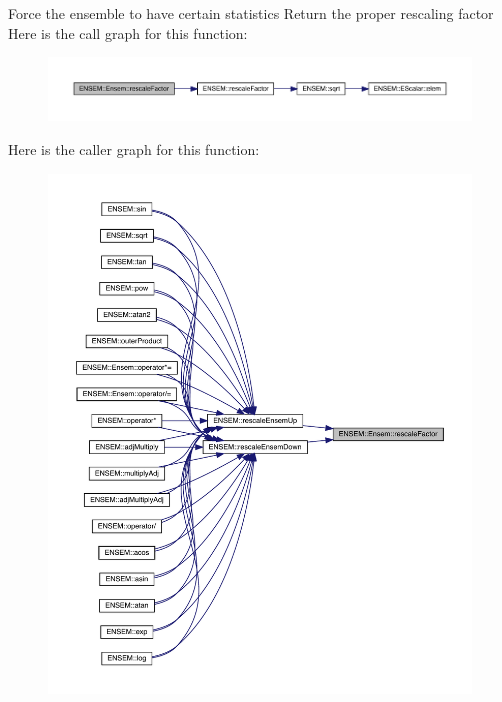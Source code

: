 Force the ensemble to have certain statistics Return the proper rescaling factor Here is the call graph for this function\+:
\nopagebreak
\begin{figure}[H]
\begin{center}
\leavevmode
\includegraphics[width=350pt]{d7/d3e/classENSEM_1_1Ensem_aecf90199daafa73454e9c1aceef313a4_cgraph}
\end{center}
\end{figure}
Here is the caller graph for this function\+:\nopagebreak
\begin{figure}[H]
\begin{center}
\leavevmode
\includegraphics[width=350pt]{d7/d3e/classENSEM_1_1Ensem_aecf90199daafa73454e9c1aceef313a4_icgraph}
\end{center}
\end{figure}
\mbox{\label{classENSEM_1_1Ensem_aecf90199daafa73454e9c1aceef313a4}} 
